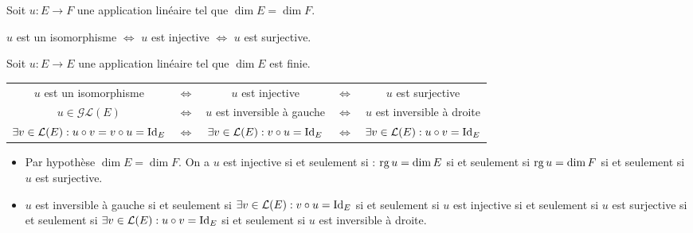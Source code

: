 \documentclass{book}
\begin{document}
\begin{Proposition}[Cas $\dim E = \dim F$]
Soit $u:E\to F$ une application linéaire tel que $\dim E = \dim F$.
\begin{center}
$u$ est un isomorphisme $\Leftrightarrow$ $u$ est injective $\Leftrightarrow$ $u$ est surjective.
\end{center}
Soit $u:E\to E$ une application linéaire tel que $\dim E$ est finie.
\begin{center}
\begin{tabular}{ccccc}
$u$ est un isomorphisme& $\Leftrightarrow$& $u$ est injective &$\Leftrightarrow$ &$u$ est surjective \\
$u\in \mathcal{GL}(E)$ &$\Leftrightarrow$ &  $u$ est inversible à gauche &$\Leftrightarrow$ &  $u$ est inversible à droite \\
$\exists v\in \mathcal{L}(E): u\circ v =v \circ u = \mathrm{Id}_E$ &$\Leftrightarrow$ &  $\exists v\in \mathcal{L}(E): v\circ u= \mathrm{Id}_E$  &$\Leftrightarrow$ &  $\exists v\in \mathcal{L}(E): u\circ v= \mathrm{Id}_E$
\end{tabular}
\end{center}
\end{Proposition}

\begin{Demonstration}
\begin{itemize}
\item  Par hypothèse $\dim E = \dim F$. On a $u$ est injective si et seulement si : $\operatorname{rg} u = \dim E$ si et seulement si $\operatorname{rg} u = \dim F$   si et seulement si $u$ est surjective.
\item $u$ est inversible à gauche  si et seulement si  $\exists v\in \mathcal{L}(E): v\circ u= \mathrm{Id}_E$   si et seulement si $u$ est injective si et seulement si $u$ est surjective  si et seulement si $\exists v\in \mathcal{L}(E): u\circ v= \mathrm{Id}_E$ si et seulement si $u$ est inversible à droite.
\end{itemize}
\end{Demonstration}
\end{document}
